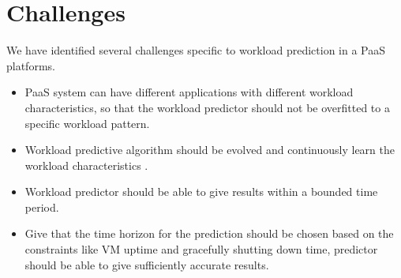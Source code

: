 \usepackage{multirow}


\section{Challenges}

We have identified several challenges specific to workload prediction in a PaaS platforms.
\begin{itemize}
\item PaaS system can have different applications with different workload characteristics, so that the workload predictor should not be overfitted to a specific workload pattern.
\end{itemize}
\begin{itemize}
\item Workload predictive algorithm should be evolved and continuously learn the workload characteristics . 
\end{itemize}
\begin{itemize}
\item Workload predictor should be able to give results within a bounded time period.
\end{itemize}
\begin{itemize}
\item Give that the  time horizon for the prediction should be chosen based on the constraints like VM uptime and gracefully shutting down time, predictor should be able to give sufficiently accurate results.
\end{itemize}


